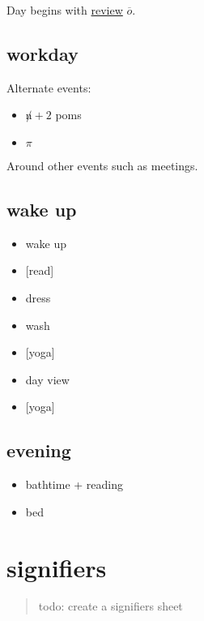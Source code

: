 \documentclass[]{book}
\providecommand{\tightlist}{%
  \setlength{\itemsep}{0pt}\setlength{\parskip}{0pt}}
\begin{document}
Day begins with \protect\hyperlink{review}{review} \(\overline o\).

\hypertarget{workday}{%
\subsection{workday}\label{workday}}

Alternate events:

\begin{itemize}
\tightlist
\item
  \(\not n + 2\) poms
\item
  \(\pi\)
\end{itemize}

Around other events such as meetings.

\hypertarget{wake-up}{%
\subsection{wake up}\label{wake-up}}

\begin{itemize}
\tightlist
\item
  wake up
\item
  {[}read{]}
\item
  dress
\item
  wash
\item
  {[}yoga{]}
\item
  \protect\hypertarget{day-view}{}{day view}
\item
  {[}yoga{]}
\end{itemize}

\hypertarget{evening}{%
\subsection{evening}\label{evening}}

\begin{itemize}
\tightlist
\item
  bathtime + reading
\item
  bed
\end{itemize}

\hypertarget{signifiers}{%
\section{signifiers}\label{signifiers}}

\begin{quote}
todo: create a signifiers sheet
\end{quote}
\end{document}
